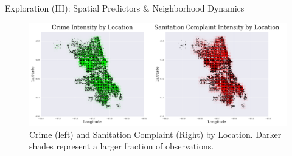 \begin{column}{\twocolwid}\vspace{-.4in} %


\begin{block}{Exploration (III): Spatial Predictors \& Neighborhood Dynamics}

\begin{figure}
%
\includegraphics[width=\linewidth]{figures/both.pdf}
\caption{Crime (left) and Sanitation Complaint (Right) by Location. Darker shades represent 
a larger fraction of observations. }
\end{figure}

\end{block}
\end{column}